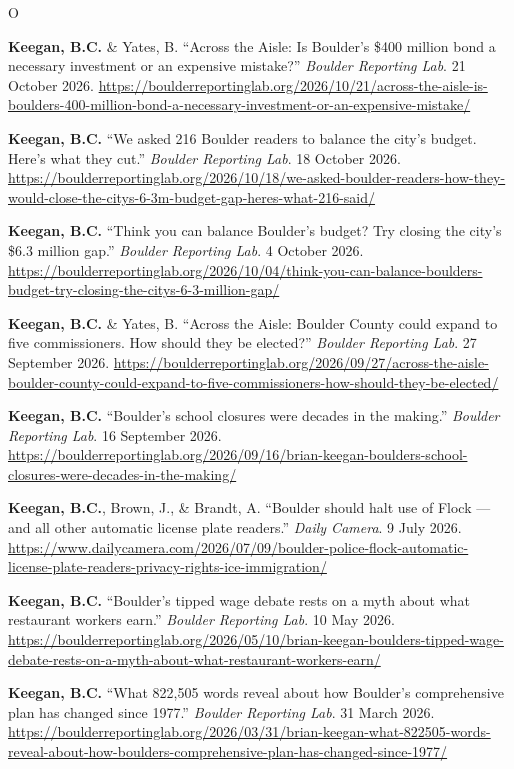 \documentclass{cv}
\begin{document}
	\begin{entries}{O}
		\item \textbf{Keegan, B.C.} \& Yates, B. ``Across the Aisle: Is Boulder's \$400 million bond a necessary investment or an expensive mistake?'' \textit{Boulder Reporting Lab}. 21 October 2026. \url{https://boulderreportinglab.org/2026/10/21/across-the-aisle-is-boulders-400-million-bond-a-necessary-investment-or-an-expensive-mistake/}
		\item \textbf{Keegan, B.C.} ``We asked 216 Boulder readers to balance the city's budget. Here's what they cut.'' \textit{Boulder Reporting Lab}. 18 October 2026. \url{https://boulderreportinglab.org/2026/10/18/we-asked-boulder-readers-how-they-would-close-the-citys-6-3m-budget-gap-heres-what-216-said/}
		\item \textbf{Keegan, B.C.} ``Think you can balance Boulder's budget? Try closing the city's \$6.3 million gap.'' \textit{Boulder Reporting Lab}. 4 October 2026. \url{https://boulderreportinglab.org/2026/10/04/think-you-can-balance-boulders-budget-try-closing-the-citys-6-3-million-gap/}
		\item \textbf{Keegan, B.C.} \& Yates, B. ``Across the Aisle: Boulder County could expand to five commissioners. How should they be elected?'' \textit{Boulder Reporting Lab}. 27 September 2026. \url{https://boulderreportinglab.org/2026/09/27/across-the-aisle-boulder-county-could-expand-to-five-commissioners-how-should-they-be-elected/}
		\item \textbf{Keegan, B.C.} ``Boulder's school closures were decades in the making.'' \textit{Boulder Reporting Lab}. 16 September 2026. \url{https://boulderreportinglab.org/2026/09/16/brian-keegan-boulders-school-closures-were-decades-in-the-making/}
		\item \textbf{Keegan, B.C.}, Brown, J., \& Brandt, A. ``Boulder should halt use of Flock --- and all other automatic license plate readers.'' \textit{Daily Camera}. 9 July 2026. \url{https://www.dailycamera.com/2026/07/09/boulder-police-flock-automatic-license-plate-readers-privacy-rights-ice-immigration/}
		\item \textbf{Keegan, B.C.} ``Boulder's tipped wage debate rests on a myth about what restaurant workers earn.'' \textit{Boulder Reporting Lab}. 10 May 2026. \url{https://boulderreportinglab.org/2026/05/10/brian-keegan-boulders-tipped-wage-debate-rests-on-a-myth-about-what-restaurant-workers-earn/}
		\item \textbf{Keegan, B.C.} ``What 822,505 words reveal about how Boulder's comprehensive plan has changed since 1977.'' \textit{Boulder Reporting Lab}. 31 March 2026. \url{https://boulderreportinglab.org/2026/03/31/brian-keegan-what-822505-words-reveal-about-how-boulders-comprehensive-plan-has-changed-since-1977/}

\end{entries}
\end{document}
